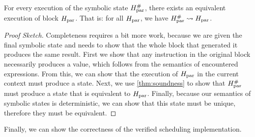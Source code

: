 {%




\begin{lemma}\label{thm:completeness}
  For every execution of the symbolic state $H_\text{par}^{\#}$, there exists an
  equivalent execution of block $H_\text{par}$. That is: for all $H_\text{par}$, we have
  $H_\text{par}^{\#} \mathrel{\leadsto} H_\text{par}$.

  \begin{proof}[Proof Sketch]
    Completeness requires a bit more work, because we are given the final
    symbolic state and needs to show that the whole block that generated it
    produces the same result.  First we show that any instruction in the
    original block necessarily produces a value, which follows from the
    semantics of encountered expressions.  From this, we can show that the
    execution of $H_\text{par}$ in the current context must produce a state. Next, we
    use \cref{thm:soundness} to show that $H_\text{par}^{\#}$ must produce a
    state that is equivalent to $H_\text{par}$. Finally, because our semantics of
    symbolic states is deterministic, we can show that this state must be
    unique, therefore they must be equivalent.
  \end{proof}
\end{lemma}

Finally, we can show the correctness of the verified scheduling implementation.

}
